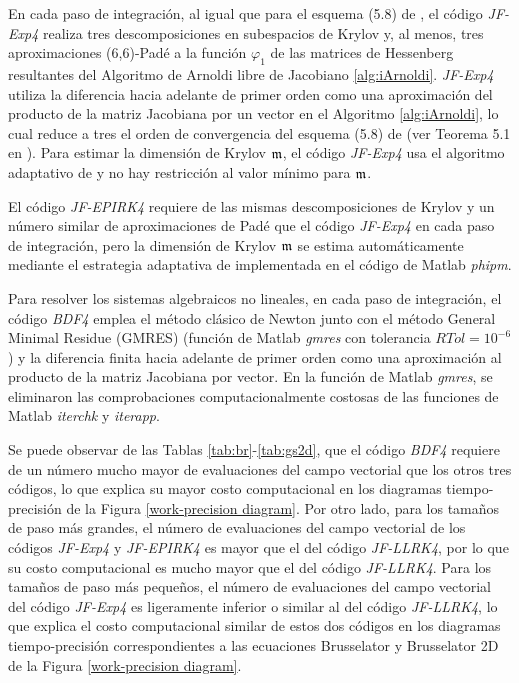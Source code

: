 En cada paso de integración, al igual que para el esquema (5.8) de \cite{hochbruck1998exponential}, el código \textit{JF-Exp4} realiza tres descomposiciones en subespacios de Krylov y, al menos, tres aproximaciones (6,6)-Padé a la función $\varphi_1$ de las matrices de Hessenberg resultantes del Algoritmo de Arnoldi libre de Jacobiano \ref{alg:iArnoldi}. \textit{JF-Exp4} utiliza la diferencia hacia adelante de primer orden como una aproximación del producto de la matriz Jacobiana por un vector en el Algoritmo \ref{alg:iArnoldi}, lo cual reduce a tres el orden de convergencia del esquema (5.8) de \cite{hochbruck1998exponential} (ver Teorema 5.1 en \cite{hochbruck1998exponential}). Para estimar la dimensión de Krylov $\mathfrak{m}$, el código \textit{JF-Exp4} usa el algoritmo adaptativo de \cite{hochbruck1998exponential} y no hay restricción al valor mínimo para $\mathfrak{m}$.

El código \textit{JF-EPIRK4} requiere de las mismas descomposiciones de Krylov y un número similar de aproximaciones de Padé que el código \textit{JF-Exp4} en cada paso de integración, pero la dimensión de Krylov $\mathfrak{m}$ se estima automáticamente mediante el estrategia adaptativa de \cite{niesen2012algorithm} implementada en el código de Matlab \textit{phipm}.

Para resolver los sistemas algebraicos no lineales, en cada paso de integración, el código \textit{BDF4} emplea el método clásico de Newton junto con el método General Minimal Residue (GMRES) (función de Matlab \textit{gmres} con tolerancia $RTol=10^{-6}$) y la diferencia finita hacia adelante de primer orden como una aproximación al producto de la matriz Jacobiana por vector. En la función de Matlab \textit{gmres}, se eliminaron las comprobaciones computacionalmente costosas de las funciones de Matlab \textit{iterchk} y \textit{iterapp}.


Se puede observar de las Tablas \ref{tab:br}-\ref{tab:gs2d}, que el código \textit{BDF4} requiere de un número mucho mayor de evaluaciones del campo vectorial que los otros tres códigos, lo que explica su mayor costo computacional en los diagramas tiempo-precisión de la Figura \ref{work-precision diagram}. Por otro lado, para los tamaños de paso más grandes, el número de evaluaciones del campo vectorial de los códigos \textit{JF-Exp4} y \textit{JF-EPIRK4} es mayor que el del código \textit{JF-LLRK4}, por lo que su costo computacional es mucho mayor que el del código \textit{JF-LLRK4}. Para los tamaños de paso más pequeños, el número de evaluaciones del campo vectorial del código \textit{JF-Exp4} es ligeramente inferior o similar al del código \textit{JF-LLRK4}, lo que explica el costo computacional similar de estos dos códigos en los diagramas tiempo-precisión correspondientes a las ecuaciones Brusselator y Brusselator 2D de la Figura \ref{work-precision diagram}.

